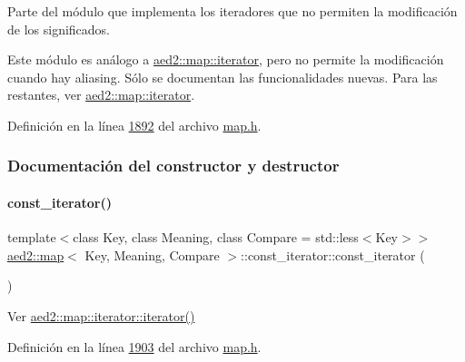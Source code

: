 Parte del módulo que implementa los iteradores que no permiten la modificación de los significados. 

Este módulo es análogo a \hyperlink{classaed2_1_1map_1_1iterator}{aed2\+::map\+::iterator}, pero no permite la modificación cuando hay aliasing. Sólo se documentan las funcionalidades nuevas. Para las restantes, ver \hyperlink{classaed2_1_1map_1_1iterator}{aed2\+::map\+::iterator}. 

Definición en la línea \hyperlink{map_8h_source_l01892}{1892} del archivo \hyperlink{map_8h_source}{map.\+h}.



\subsubsection{Documentación del constructor y destructor}
\mbox{\label{classaed2_1_1map_1_1const__iterator_a8add3e4cabbdaf313b0e085064491555_a8add3e4cabbdaf313b0e085064491555}} 
\paragraph{\texorpdfstring{const\+\_\+iterator()}{const\_iterator()}\hspace{0.1cm}{\footnotesize\ttfamily [1/3]}}
{\footnotesize\ttfamily template$<$class Key, class Meaning, class Compare = std\+::less$<$\+Key$>$$>$ \\
\hyperlink{classaed2_1_1map}{aed2\+::map}$<$ Key, Meaning, Compare $>$\+::const\+\_\+iterator\+::const\+\_\+iterator (\begin{DoxyParamCaption}{ }\end{DoxyParamCaption})\hspace{0.3cm}{\ttfamily [inline]}}



Ver \hyperlink{classaed2_1_1map_1_1iterator_acdd790eb54216601a2e0591776004dba_acdd790eb54216601a2e0591776004dba}{aed2\+::map\+::iterator\+::iterator()} 



Definición en la línea \hyperlink{map_8h_source_l01903}{1903} del archivo \hyperlink{map_8h_source}{map.\+h}.

